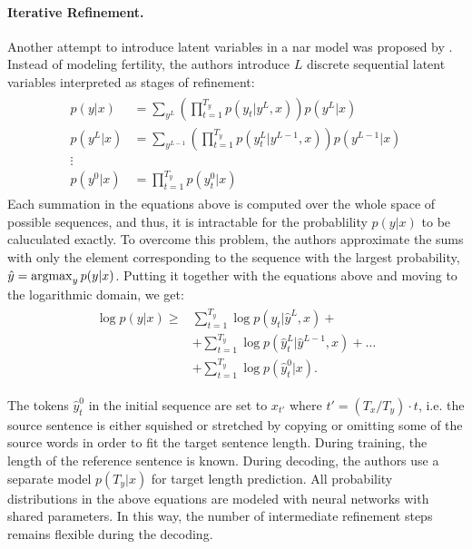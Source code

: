 \paragraph{Iterative Refinement.} Another attempt to introduce latent variables
in a \acl{nar} model was proposed by \citet{lee-etal-2018-deterministic}.
Instead of modeling fertility, the authors introduce $L$ discrete sequential
latent variables interpreted as stages of refinement:
%
\begin{align}
  \begin{split}
    p(y|x) & = \sum_{y^L}
      \left( \prod_{t=1}^{T_y} p(y_t|y^L, x) \right) p(y^L|x) \\
    p(y^L|x) & = \sum_{y^{L-1}}
      \left( \prod_{t=1}^{T_y} p(y_t^L | y^{L-1}, x) \right)
      p(y^{L-1}|x) \\
    \vdots \\
    p(y^0|x) & = \prod_{t=1}^{T_y} p(y_t^0|x)
  \end{split}
\end{align}
%
Each summation in the equations above is computed over the whole space of
possible sequences, and thus, it is intractable for the probablility $p(y|x)$
to be caluculated exactly. To overcome this problem, the authors approximate
the sums with only the element corresponding to the sequence with the largest
probability, $\hat{y} = \operatorname*{argmax}_{y}p(y|x)$.%
Putting it together with the equations above
and moving to the logarithmic domain, we get:
\begin{align}
  \begin{split}
    \log p(y|x) \geq
    & \sum_{t=1}^{T_y} \log p(y_t| \hat{y}^L, x) + \\
    & + \sum_{t=1}^{T_y} \log p(\hat{y}_t^{L}| \hat{y}^{L-1}, x) + \ldots \\
    & + \sum_{t=1}^{T_y} \log p(\hat{y}_t^0 | x). \label{eq:refinement-lowerbound}
  \end{split}
\end{align}

The tokens $\hat{y}_t^0$ in the initial sequence are set to $x_{t'}$ where
$t' = (T_x / T_y) \cdot t$, i.e. the source sentence is either squished or
stretched by copying or omitting some of the source words in order to fit the
target sentence length. During training, the length of the reference sentence
is known. During decoding, the authors use a separate model $p(T_y|x)$ for
target length prediction. All probability distributions in the above equations
are modeled with neural networks with shared parameters. In this way, the
number of intermediate refinement steps remains flexible during the decoding.

